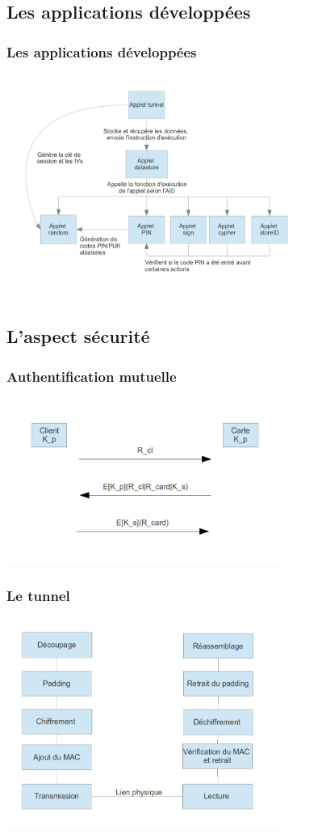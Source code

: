 \documentclass{beamer}
\begin{document}
\subsection{Les applications développées}
\begin{frame}
    \frametitle{Les applications développées}
    \includegraphics[width=10cm]{graphe_dep}
    \begin{block}{}
    \end{block}
\end{frame}

\subsection{L'aspect sécurité}
\begin{frame}
    \frametitle{Authentification mutuelle}
    \includegraphics[width=9cm]{question}
\end{frame}



\begin{frame}
    \frametitle{Le tunnel}
    \includegraphics[width=9cm]{stack}
\end{frame}
\end{document}
